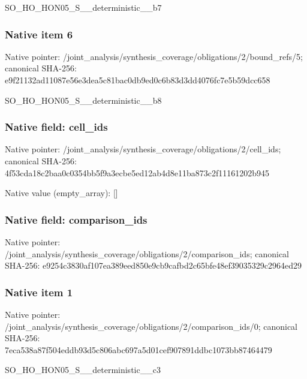\documentclass[10pt,a4paper]{article}
\begin{document}
\begingroup\raggedright\sloppy SO\_\allowbreak{}HO\_\allowbreak{}HON05\_\allowbreak{}S\_\allowbreak{}\_\allowbreak{}deterministic\_\allowbreak{}\_\allowbreak{}b7\par\endgroup

\subsubsection{Native item 6}
Native pointer: /joint\_\allowbreak{}analysis/synthesis\_\allowbreak{}coverage/obligations/2/bound\_\allowbreak{}refs/5; canonical SHA-256: e9f21132ad11087e56e3dea5c81bac0db9ed0c6b83d3dd4076fc7e5b59dcc658

\begingroup\raggedright\sloppy SO\_\allowbreak{}HO\_\allowbreak{}HON05\_\allowbreak{}S\_\allowbreak{}\_\allowbreak{}deterministic\_\allowbreak{}\_\allowbreak{}b8\par\endgroup

\subsubsection{Native field: cell\_\allowbreak{}ids}
Native pointer: /joint\_\allowbreak{}analysis/synthesis\_\allowbreak{}coverage/obligations/2/cell\_\allowbreak{}ids; canonical SHA-256: 4f53cda18c2baa0c0354bb5f9a3ecbe5ed12ab4d8e11ba873c2f11161202b945

Native value (empty\_\allowbreak{}array): []

\subsubsection{Native field: comparison\_\allowbreak{}ids}
Native pointer: /joint\_\allowbreak{}analysis/synthesis\_\allowbreak{}coverage/obligations/2/comparison\_\allowbreak{}ids; canonical SHA-256: e9254c3830af107ea389eed850e9cb9cafbd2c65bfe48ef39035329c2964ed29

\subsubsection{Native item 1}
Native pointer: /joint\_\allowbreak{}analysis/synthesis\_\allowbreak{}coverage/obligations/2/comparison\_\allowbreak{}ids/0; canonical SHA-256: 7eca538a87f504eddb93d5c806abc697a5d01cef907891ddbc1073bb87464479

\begingroup\raggedright\sloppy SO\_\allowbreak{}HO\_\allowbreak{}HON05\_\allowbreak{}S\_\allowbreak{}\_\allowbreak{}deterministic\_\allowbreak{}\_\allowbreak{}c3\par\endgroup
\end{document}
